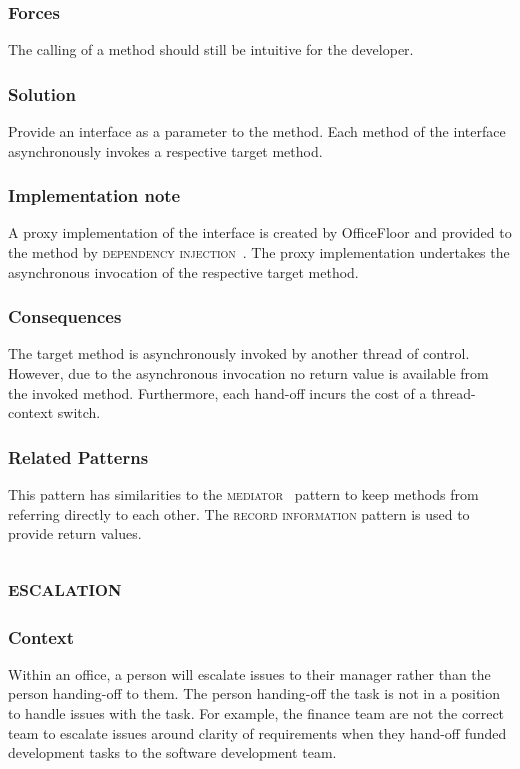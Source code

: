 \documentclass[prodmode]{style/acmlarge}
\begin{document}
\subsubsection*{Forces} The calling of a method should still be intuitive for
the developer.

\subsubsection*{Solution}  Provide an interface as a parameter to the method.
Each method of the interface asynchronously invokes a respective target method.

\subsubsection*{Implementation note} A proxy implementation of the interface is
created by OfficeFloor and provided to the method by \textsc{dependency
injection}~\cite{ioc}.  The proxy implementation undertakes the asynchronous
invocation of the respective target method.

\subsubsection*{Consequences} The target method is asynchronously invoked by
another thread of control.  However, due to the asynchronous invocation no
return value is available from the invoked method.  Furthermore, each hand-off
incurs the cost of a thread-context switch.

\subsubsection*{Related Patterns} This pattern has similarities to the
\textsc{mediator}~\cite{gof} pattern to keep methods from referring directly to
each other.  The \textsc{record information} pattern is used to provide return
values.



\subsection{\textsc{\textbf{escalation}}}

\subsubsection*{Context} Within an office, a person will escalate issues to
their manager rather than the person handing-off to them.  The person
handing-off the task is not in a position to handle issues with the task.  For
example, the finance team are not the correct team to escalate issues around
clarity of requirements when they hand-off funded development tasks to the
software development team.
\end{document}
